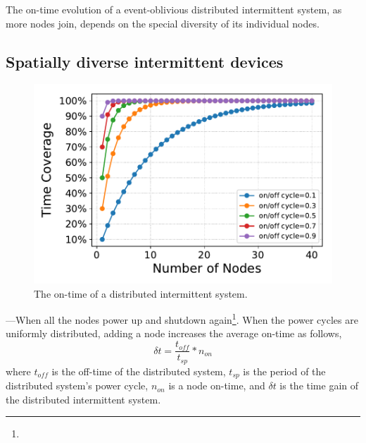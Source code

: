 
The on-time evolution of a event-oblivious distributed intermittent system, as more nodes join, depends on the special diversity of its individual nodes.
\subsection{Spatially diverse intermittent devices}
%
\begin{figure}
	\centering
		\includegraphics[width=\columnwidth]{figures/coverage.pdf}
	\caption{The on-time of a distributed intermittent system.}
	\label{fig:independentCoverage}
\end{figure}
%
---When all the nodes power up and shutdown again\footnote{}. 
When the power cycles are uniformly distributed, adding a node increases the average on-time as follows, 
%
\begin{equation}
\delta t = \frac{t_{off}}{t_{sp}} * n_{on}
		\label{eq:indCov}
\end{equation}
%
where $t_{off}$ is the off-time of the distributed system, $t_{sp}$ is the period of the distributed system's power cycle, $n_{on}$ is a node on-time, and $\delta t$ is the time gain of the distributed intermittent system.

